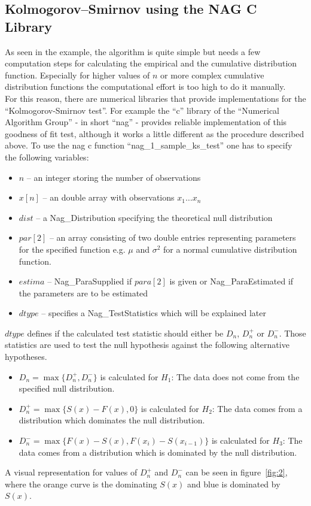 \documentclass{article}
\begin{document}
\subsection{Kolmogorov–Smirnov using the NAG C Library}
As seen in the example, the algorithm is quite simple but needs a few computation steps for calculating the empirical and the cumulative distribution function.
Especially for higher values of $n$ or more complex cumulative distribution functions the computational effort is too high to do it manually.\\
For this reason, there are numerical libraries that provide implementations for the ``Kolmogorov-Smirnov test''. For example the ``c'' library of the ``Numerical Algorithm Group'' - in short ``nag'' - provides reliable implementation of this goodness of fit test, although it works a little different as the procedure described above.
To use the nag c function ``nag\_1\_sample\_ks\_test'' one has to specify the following variables:
\begin{itemize}
\item $n$ -- an integer storing the number of observations
\item $x[n]$ -- an double array with observations $x_1 … x_n$
\item $dist$ -- a Nag\_Distribution specifying the theoretical null distribution
\item $par[2]$ -- an array consisting of two double entries representing parameters for the specified function e.g. $\mu$ and $\sigma^2$ for a normal cumulative distribution function.
\item $estima$ -- Nag\_ParaSupplied if $para[2]$ is given or Nag\_ParaEstimated if the parameters are to be estimated
\item $dtype$ -- specifies a Nag\_TestStatistics which will be explained later
\end{itemize}
$dtype$ defines if the calculated test statistic should either be $D_n$, $D^+_n$ or $D^-_n$.
Those statistics are used to test the null hypothesis against the following alternative hypotheses.
\begin{itemize}
\item $D_n=\max\{D^+_n,D^-_n\}$ is calculated for $H_1 $: The data does not come from the specified null distribution.\\
\item $D^+_n=\max\{S(x)-F(x),0\}$ is calculated for $H_2$: The data comes from a distribution which dominates the null distribution.\\
\item $D^-_n=\max\{F(x)-S(x),F(x_i)-S(x_{i-1})\}$ is calculated for $H_3$: The data comes from a distribution which is dominated by the null distribution.\\
\end{itemize}
A visual representation for values of $D_n^+$ and $D_n^-$ can be seen in figure~\ref{fig:2}, where the orange curve is the dominating $S(x)$ and blue is dominated by $S(x)$.
\end{document}
